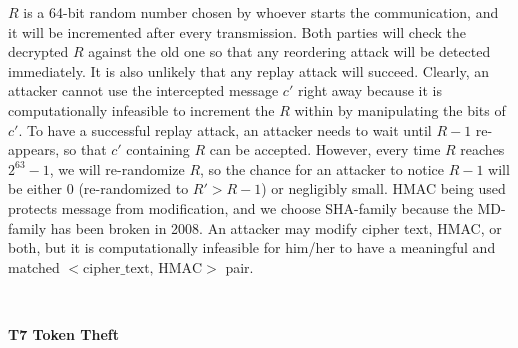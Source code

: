 \documentclass[letterpaper,11pt]{article}
\newcommand{\resheading}[1]{{\large \colorbox{mygrey}{\begin{minipage}{\textwidth}{\textbf{#1 \vphantom{p\^{E}}}}\end{minipage}}}}
\begin{document}
\begin{itemize}[noitemsep,topsep=0pt,parsep=1pt,partopsep=1pt]
\begin{flushleft}
		$R$ is a 64-bit random number chosen by whoever starts the communication, and it will be incremented after every transmission. Both parties will check the decrypted $R$ against the old one so that any reordering attack will be detected immediately. It is also unlikely that any replay attack will succeed. Clearly, an attacker cannot use the intercepted message $c'$ right away because it is computationally infeasible to increment the $R$ within by manipulating the bits of $c'$. To have a successful replay attack, an attacker needs to wait until $R-1$ re-appears, so that $c'$ containing $R$ can be accepted. However, every time $R$ reaches $2^{63}-1$, we will re-randomize $R$, so the chance for an attacker to notice $R-1$ will be either $0$ (re-randomized to $R'>R-1$) or negligibly small. HMAC being used protects message from modification, and we choose SHA-family because the MD-family has been broken in 2008. An attacker may modify cipher text, HMAC, or both, but it is computationally infeasible for him/her to have a meaningful and matched $<\textrm{cipher\_text},\,\textrm{HMAC}>$ pair.
	\end{flushleft}
\end{itemize}
    $\,$\\
\resheading{T7 Token Theft}
\vspace{0.1in}
\end{document}
